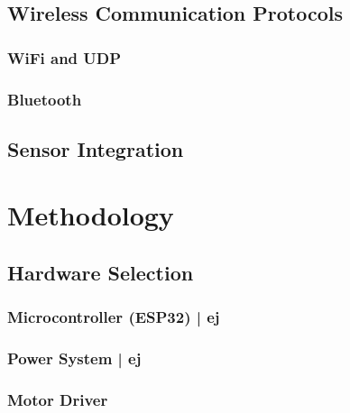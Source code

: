 \documentclass[a4paper, 12pt,titlepage,openany]{report}
\begin{document}
	\section{Wireless Communication Protocols}
	\label{sec:TheoryComm}
	
	\subsection{WiFi and UDP}
	
	\subsection{Bluetooth}
	
	\section{Sensor Integration}
	\label{sec:TheorySensors}
	
	\chapter{Methodology}
	
	\section{Hardware Selection}
	
	\subsection{Microcontroller (ESP32) | \acs{ej}}
	\label{sub:microESP32}
	
	
	\subsection{Power System | \acs{ej}}
	\label{sub:PowerSystem}
	
	
	\subsection{Motor Driver}
	
\end{document}
